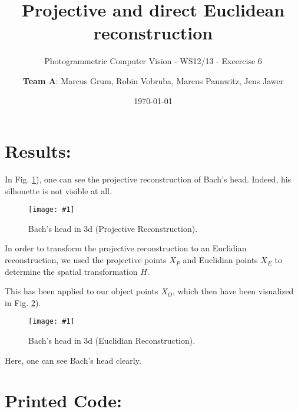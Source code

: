 \documentclass[a4paper,headings=small]{scrartcl}
\title{Projective and direct Euclidean reconstruction}
\subtitle{Photogrammetric Computer Vision - WS12/13 - Excercise 6}
\author{\textbf{Team A}: Marcus Grum, Robin Vobruba, Marcus Pannwitz, Jens Jawer}
\date{\today}
\numberwithin{equation}{section} %
\numberwithin{figure}{section}   %
\newcommand{\image}[3]{
	\begin{figure}[htbp]
		\centering
		\texttt{[image: \#1]}
		\caption{#3}
		\label{fig:#1}
	\end{figure}
}
\newcommand{\imgRootGenerated}{../../../target}
\begin{document}
\maketitle

\section{Results:}

In Fig. \ref{fig:\imgRootGenerated/projectiveReconstruction.png}), one can see the projective reconstruction
of Bach's head. Indeed, his silhouette is not visible at all.

\image{\imgRootGenerated/projectiveReconstruction.png}{0.2}{%
		Bach's head in 3d (Projective Reconstruction).}

In order to transform the projective reconstruction to an Euclidian reconstruction,
we used the projective points $X_P$ and Euclidian points $X_E$
to determine the spatial transformation $H$.

This has been applied to our object points $X_O$, which then have been visualized
in Fig. \ref{fig:\imgRootGenerated/euclidianReconstruction.png}).

\image{\imgRootGenerated/euclidianReconstruction.png}{0.2}{%
		Bach's head in 3d (Euclidian Reconstruction).}

Here, one can see Bach's head clearly.

\newpage
\section{Printed Code:}


\end{document}
